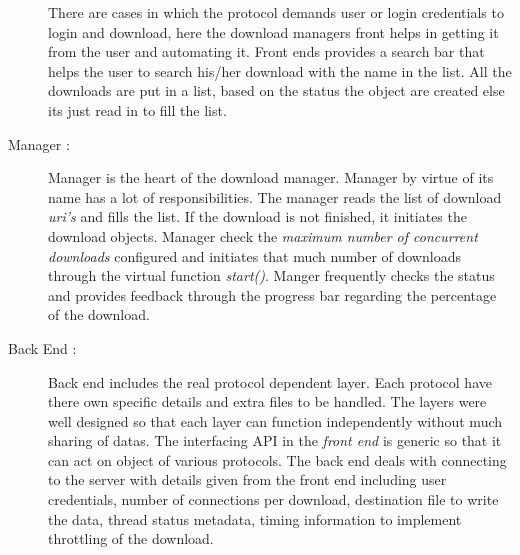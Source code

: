 \documentclass[pdftex,12pt,a4paper,pdfencoding=unicode]{article}
\begin{document}
\begin{onehalfspace}
\begin{description}
          There are cases in which the protocol demands user or login credentials to login and download, here the download managers front
          helps in getting it from the user and automating it. Front ends provides a search bar that helps the user to search his/her
          download with the name in the list. All the downloads are put in a list, based on the status the object are created else its
          just read in to fill the list.

        \item[Manager :] Manager is the heart of the download manager. Manager by virtue of its name has a lot of responsibilities. The
          manager reads the list of download \emph{uri's} and fills the list. If the download is not finished, it initiates the download
          objects. Manager check the \emph{maximum number of concurrent downloads} configured and initiates that much number of downloads
          through the virtual  function \emph{start()}. Manger frequently checks the status and provides feedback through the progress bar
          regarding the percentage of the download.

        \item[Back End :] Back end includes the real protocol dependent layer. Each protocol have there own specific details and extra
          files to be handled. The layers were well designed so that each layer can function independently without much sharing of datas.
          The interfacing API in the \emph{front end} is generic so that it can act on object of various protocols. The back end deals with
          connecting to the server with details given from the front end including user credentials, number of connections per download,
          destination file to write the data, thread status metadata, timing information to implement throttling of the download.

      \end{description}
\end{onehalfspace}
\end{document}
